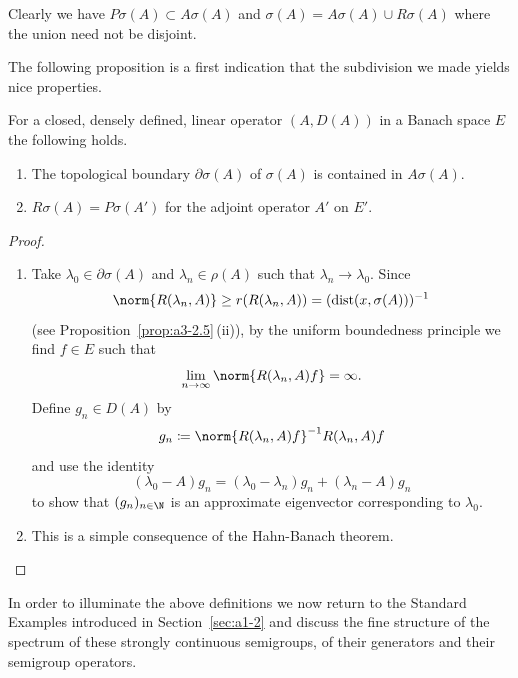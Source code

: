 Clearly we have $P\sigma(A) \subset A\sigma(A)$ and $\sigma(A) = A\sigma(A) \cup R\sigma(A)$ where the union need not be disjoint.

The following proposition is a first indication that the subdivision we made yields nice properties.
\begin{proposition}\label{prop:a3-2.2}
For a closed, densely defined, linear operator $(A,D(A))$ in a Banach space $E$ the following holds.
\begin{enumerate}[\upshape (i)]

\item
The topological boundary $\partial\sigma(A)$ of\/ $\sigma(A)$ is contained in $A\sigma(A)$.

\item
{}
$R\sigma(A) = P\sigma(A')$ for the adjoint operator $A'$ on $E'$.

\end{enumerate}
\end{proposition}
\begin{proof}
\begin{enumerate}[\upshape (i), wide, labelindent=.25em]

\item 
Take $\lambda_{0} \in \partial\sigma(A)$ and $\lambda_{n} \in \rho(A)$ such that $\lambda_{n} \to \lambda_{0}$.
Since 
%
\[
	 \norm{R(\lambda_{n},A)} \geq r(R(\lambda_{n},A)) = (\text{dist}(x,\sigma(A)))^{-1} 
\]
%
(see Proposition~\ref{prop:a3-2.5}\,(ii)), by the uniform boundedness principle we find $f \in E$ such that
\[
	\lim_{n \to \infty}\norm{R(\lambda_n ,A)f} = \infty .
\]
Define $g_{n} \in D(A)$ by
\[
g_{n} \coloneqq \norm{R(\lambda_{n},A)f}^{-1} R(\lambda_{n},A)f
\]
and use the identity
\[
	(\lambda_{0} - A)g_{n} = (\lambda_{0} - \lambda_{n})g_{n} + (\lambda_{n} - A)g_{n}
\]
to show that $(g_{n})_{n \in \N}$ is an approximate eigenvector corresponding to $\lambda_{0}$.

\item 
This is a simple consequence of the Hahn-Banach theorem.
\end{enumerate}
\end{proof}
In order to illuminate the above definitions we now return to the Standard Examples introduced in Section~\ref{sec:a1-2} and discuss the fine structure of the spectrum of these strongly continuous semigroups, \ie of their generators and their semigroup operators.
